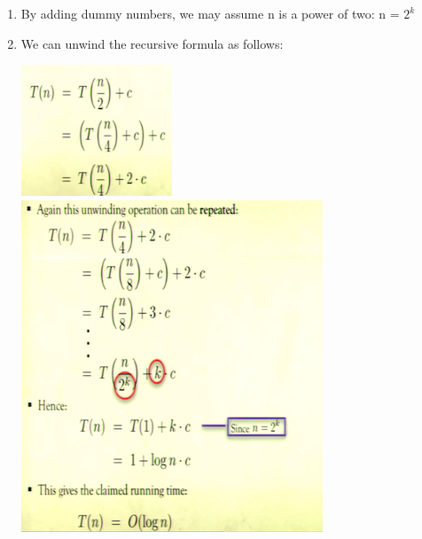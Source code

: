 \documentclass[12pt]{article}
\begin{document}
\begin{itemize}
\begin{itemize}
	\begin{enumerate}
	\item By adding dummy numbers, we may assume n is a power of two: n = 					$2^k$
	\item We can unwind the recursive formula as follows:
	\begin{center}
	\includegraphics{lecture2e}
	\includegraphics{lecture2f}
	\end{center}	
	\end{enumerate}
	\end{itemize}
\end{itemize}	
	
	
	
\end{document}
